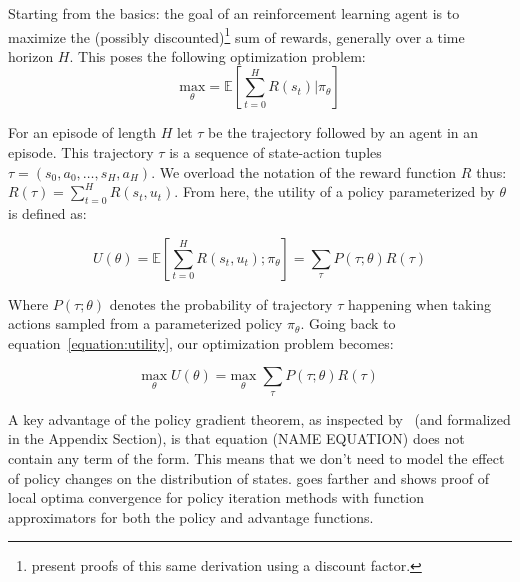 \documentclass{../main.tex}{subfiles}
\begin{document}
Starting from the basics: the goal of an reinforcement learning agent is to maximize the (possibly discounted)\footnote{\cite{Williams1992, Sutton1999} present proofs of this same derivation using a discount factor.} sum of rewards, generally over a time horizon $H$. This poses the following optimization problem:
\begin{equation}\label{equation:expected-reward-theta}
\underset{\theta}{\text{max}} = \mathbb{E}[\sum^{H}_{t=0} R(s_t) | \pi_{\theta}]
\end{equation}

For an episode  of length $H$ let $\tau$ be the trajectory followed by an agent in an episode. This trajectory $\tau$ is a sequence of state-action tuples $\tau = (s_0, a_0, \dots, s_H, a_H)$. We overload the notation of the reward function $R$ thus: $R(\tau) = \sum_{t=0}^{H}R(s_t, u_t)$. From here, the utility of a policy parameterized by $\theta$ is defined as:

\begin{equation}\label{equation:utility}
U(\theta) = \mathbb{E}[\sum_{t=0}^{H}R(s_t, u_t) ; \pi_{\theta}] = \sum_{\tau}P(\tau ; \theta)R(\tau)
\end{equation}

Where $P(\tau ; \theta)$ denotes the probability of trajectory $\tau$ happening when taking actions sampled from a parameterized policy $\pi_{\theta}$. Going back to equation~\ref{equation:utility}, our optimization problem becomes:

\begin{equation}\label{equation:utility-optimization}
\underset{\theta}{\text{max}}\; U(\theta) = \underset{\theta}{\text{max}}\; \sum_{\tau}P(\tau ; \theta)R(\tau)
\end{equation}


A key advantage of the policy gradient theorem, as inspected by~\cite{Sutton1999} (and formalized in the Appendix Section), is that equation (NAME EQUATION) does not contain any term of the form. This means that we don't need to model the effect of policy changes on the distribution of states. \citep{Sutton1999} goes farther and shows proof of local optima convergence for policy iteration methods with function approximators for both the policy and advantage functions.
\end{document}
